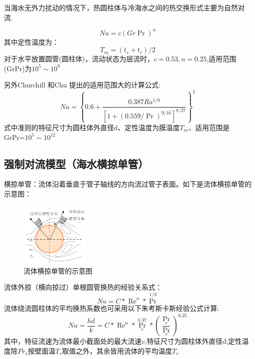 \documentclass{article}
\begin{document}
   当海水无外力扰动的情况下，热圆柱体与冷海水之间的热交换形式主要为自然对流.
   \par
   \par
   
   \begin{equation}
   N u=c(G r \operatorname{Pr})^{n}
   \end{equation}
   其中定性温度为：
   \begin{equation}
   T_{m}=\left(t_{s}+t_{r}\right) / 2
   \end{equation}
   对于水平放置圆管(圆柱体)，流动状态为层流时，$c=0.53,n=0.25$,适用范围(GrPr)为$10^{5} \sim 10^{9}$
   
   另外Churchill 和Chu 提出的适用范围大的计算公式:
   \begin{equation}
   Nu=\left\{0.6+\frac{0.387 R a^{1 / 6}}{\left[1+(0.559 / \operatorname{Pr})^{9 / 16}\right]^{8 / 27}}\right\}^{2}
   \label{Nu1}
   \end{equation}
   式中准则的特征尺寸为圆柱体外直径d、定性温度为膜温度$T_m$、适用范围是
   GrPr=$10^5 \sim 10^{12}$
   \subsection{强制对流模型（海水横掠单管）}
   横掠单管：流体沿着垂直于管子轴线的方向流过管子表面。如下是流体横掠单管的示意图：
   \begin{figure}[H]
   	\centering
   	\includegraphics[width=0.3\textwidth]{img/示意图.png}
   	\caption{流体横掠单管的示意图}\label{fig:shiyitu}
   \end{figure}
   流体外掠（横向掠过）单根圆管换热的经验关系式：
   \begin{equation}
   Nu=C * \operatorname{Re}^{n} * \operatorname{Pr}^{1 / 3}
   \end{equation}
   流体绕流圆柱体的平均换热系数也可采用以下朱考斯卡斯经验公式计算:
   \begin{equation}
   N u=\frac{{h} d}{k}=C* \operatorname{Re}^{n }* \operatorname{Pr}_{r}^{0.37} *\left(\frac{\operatorname{Pr}_{r}}{\operatorname{Pr}_{s}}\right)^{0.25}
   \label{Nu2}
   \end{equation}
   其中，特征流速为流体最小截面处的最大流速$v$,特征尺寸为圆柱体外直径d;定性温度除$Pr_s$按壁面温$T_s$取值之外，其余皆用流体的平均温度$T_r$
   
\end{document}

